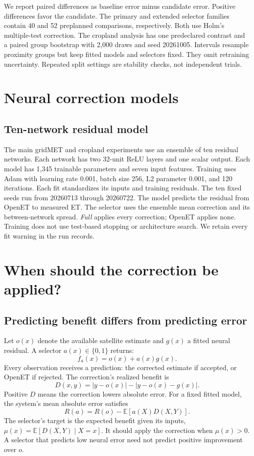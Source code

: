 \documentclass[10pt,letterpaper]{article}
\newcommand{\E}{\mathbb{E}}
\begin{document}
We report paired differences as baseline error minus candidate error.
Positive differences favor the candidate.
The primary and extended selector families contain 40 and 52 preplanned comparisons, respectively.
Both use Holm's multiple-test correction.
The cropland analysis has one predeclared contrast and a paired group bootstrap with 2,000 draws and seed 20261005.
Intervals resample proximity groups but keep fitted models and selectors fixed.
They omit retraining uncertainty.
Repeated split settings are stability checks, not independent trials.

\section{Neural correction models}\label{sec:models}
\subsection{Ten-network residual model}
The main gridMET and cropland experiments use an ensemble of ten residual networks.
Each network has two 32-unit ReLU layers and one scalar output.
Each model has 1,345 trainable parameters and seven input features.
Training uses Adam with learning rate 0.001, batch size 256, L2 parameter 0.001, and 120 iterations.
Each fit standardizes its inputs and training residuals.
The ten fixed seeds run from 20260713 through 20260722.
The model predicts the residual from OpenET to measured ET.
The selector uses the ensemble mean correction and its between-network spread.
\emph{Full} applies every correction; OpenET applies none.
Training does not use test-based stopping or architecture search.
We retain every fit warning in the run records.

\section{When should the correction be applied?}\label{sec:selective}
\subsection{Predicting benefit differs from predicting error}
Let $o(x)$ denote the available satellite estimate and $g(x)$ a fitted neural residual.
A selector $a(x)\in\{0,1\}$ returns:
\begin{equation}
 f_a(x)=o(x)+a(x)g(x).
\end{equation}
Every observation receives a prediction: the corrected estimate if accepted, or OpenET if rejected.
The correction's realized benefit is
\begin{equation}\label{eq:gain}
 D(x,y)=|y-o(x)|-|y-o(x)-g(x)|.
\end{equation}
Positive $D$ means the correction lowers absolute error.
For a fixed fitted model, the system's mean absolute error satisfies
\begin{equation}\label{eq:selective-risk}
 R(a)=R(o)-\E[a(X)D(X,Y)].
\end{equation}
The selector's target is the expected benefit given its inputs, $\mu(x)=\E[D(X,Y)\mid X=x]$.
It should apply the correction when $\mu(x)>0$.
A selector that predicts low neural error need not predict positive improvement over $o$.
\end{document}
